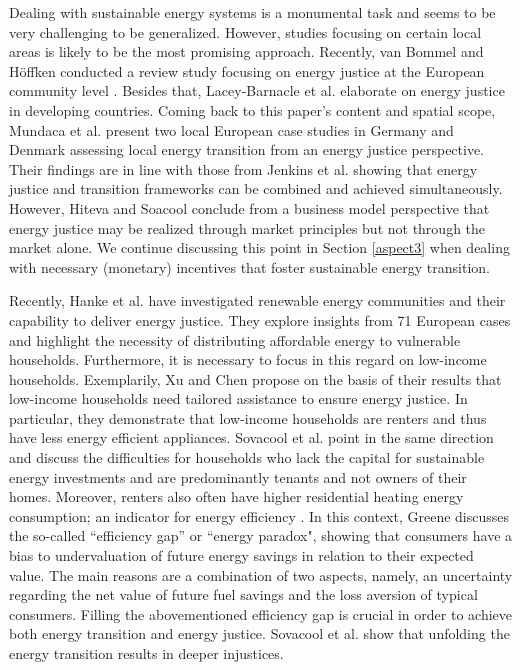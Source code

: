 Dealing with sustainable energy systems is a monumental task and seems to be very challenging to be generalized. However, studies focusing on certain local areas is likely to be the most promising approach. Recently, van Bommel and Höffken conducted a review study focusing on energy justice at the European community level \cite{van2021energy}. Besides that, Lacey-Barnacle et al. \cite{lacey2020energy} elaborate on energy justice in developing countries. Coming back to this paper's content and spatial scope, Mundaca et al. \cite{mundaca2018successful} present two local European case studies in Germany and Denmark assessing local energy transition from an energy justice perspective. Their findings are in line with those from Jenkins et al. \cite{jenkins2018humanizing} showing that energy justice and transition frameworks can be combined and achieved simultaneously. However, Hiteva and Soacool \cite{hiteva2017harnessing} conclude from a business model perspective that energy justice may be realized through market principles but not through the market alone. We continue discussing this point in Section \ref{aspect3} when dealing with necessary (monetary) incentives that foster sustainable energy transition. \vspace{0.5cm} 

Recently, Hanke et al. \cite{hanke2021renewable} have investigated renewable energy communities and their capability to deliver energy justice. They explore insights from 71 European cases and highlight the necessity of distributing affordable energy to vulnerable households. Furthermore, it is necessary to focus in this regard on low-income households. Exemplarily, Xu and Chen \cite{xu2019energy} propose on the basis of their results that low-income households need tailored assistance to ensure energy justice. In particular, they demonstrate that low-income households are renters and thus have less energy efficient appliances. Sovacool et al. \cite{sovacool2019temporality} point in the same direction and discuss the difficulties for households who lack the capital for sustainable energy investments and are predominantly tenants and not owners of their homes. Moreover, renters also often have higher residential heating energy consumption; an indicator for energy efficiency \cite{reames2016targeting}. In this context, Greene \cite{greene2011uncertainty} discusses the so-called “efficiency gap” or “energy paradox", showing that consumers have a bias to undervaluation of future energy savings in relation to their expected value. The main reasons are a combination of two aspects, namely, an uncertainty regarding the net value of future fuel savings and the loss aversion of typical consumers. Filling the abovementioned efficiency gap is crucial in order to achieve both energy transition and energy justice. Sovacool et al. \cite{sovacool2019decarbonization} show that unfolding the energy transition results in deeper injustices.

